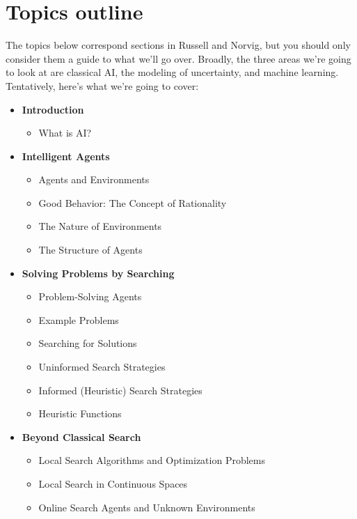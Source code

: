 \documentclass{article}
\begin{document}
\section*{Topics outline} 

The topics below correspond sections in Russell and Norvig, but you
should only consider them a guide to what we'll go over. Broadly, the
three areas we're going to look at are classical AI, the modeling of
uncertainty, and machine learning.\\

\noindent
Tentatively, here's what we're going to cover:

\begin{itemize}
  \item \textbf{Introduction}
    \begin{itemize}
      \item What is AI?
    \end{itemize}

  \item \textbf{Intelligent Agents}
    \begin{itemize}
      \item Agents and Environments
      \item Good Behavior: The Concept of Rationality
      \item The Nature of Environments
      \item The Structure of Agents
    \end{itemize}

  \item \textbf{Solving Problems by Searching}
    \begin{itemize}
      \item Problem-Solving Agents
      \item Example Problems
      \item Searching for Solutions
      \item Uninformed Search Strategies
      \item Informed (Heuristic) Search Strategies
      \item Heuristic Functions
    \end{itemize}

  \item \textbf{Beyond Classical Search}
    \begin{itemize}
      \item Local Search Algorithms and Optimization Problems
      \item Local Search in Continuous Spaces
      \item Online Search Agents and Unknown Environments
    \end{itemize}


\end{itemize}
\end{document}
